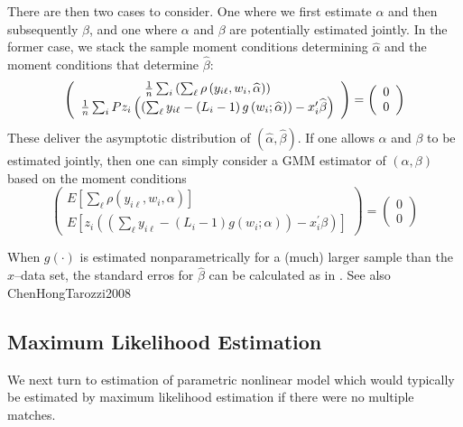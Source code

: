 \documentclass[12pt]{article}
\renewcommand{\cite}{\citeasnoun}
\begin{document}
There are then two cases to consider. One where we first estimate $\alpha $
and then subsequently $\beta $, and one where $\alpha $ and $\beta $ are
potentially estimated jointly. In the former case, we stack the sample
moment conditions determining $\widehat{\alpha }$ and the moment conditions
that determine $\widehat{\beta }$:%
\begin{equation*}
\left(
\begin{array}{c}
\frac{1}{n}\sum_{i}\left( \sum_{\ell }\rho \left( y_{i\ell },w_{i},\widehat{%
\alpha }\right) \right) \\
\frac{1}{n}\sum_{i}Pz_{i}\left( \left( \sum_{\ell }y_{i\ell }-\left(
L_{i}-1\right) g\left( w_{i};\widehat{\alpha }\right) \right) -x_{i}^{\prime
}\widehat{\beta }\right)%
\end{array}%
\right) =\left(
\begin{array}{c}
0 \\
0%
\end{array}%
\right)
\end{equation*}%
These deliver the asymptotic distribution of $\left( \widehat{\alpha },%
\widehat{\beta }\right) $. If one allows $\alpha $ and $\beta $ to be
estimated jointly, then one can simply consider a GMM estimator of $\left(
\alpha ,\beta \right) $ based on the moment conditions
\begin{equation*}
\left(
\begin{array}{c}
E\left[ \sum_{\ell }\rho \left( y_{i\ell },w_{i},\alpha \right) \right] \\
E\left[ z_{i}\left( \left( \sum_{\ell }y_{i\ell }-\left( L_{i}-1\right)
g\left( w_{i};\alpha \right) \right) -x_{i}^{\prime }\beta \right) \right]%
\end{array}%
\right) =\left(
\begin{array}{c}
0 \\
0%
\end{array}%
\right)
\end{equation*}

When $g\left( \cdot \right) $ is estimated nonparametrically for a (much)
larger sample than the $x$--data set, the standard erros for $\widehat{\beta
}$ can be calculated as in \cite{ChenHongTamer2005}. See also \cite%
{ChenHongTarozzi2008}

\subsection{Maximum Likelihood Estimation}

We next turn to estimation of parametric nonlinear model which would
typically be estimated by maximum likelihood estimation if there were no
multiple matches.
\end{document}
